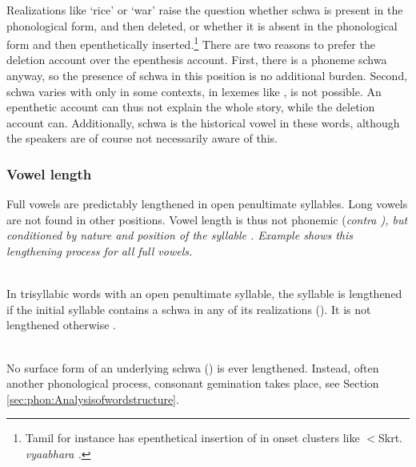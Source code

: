 Realizations like `rice' or `war' raise the question whether schwa is present in the phonological form, and then deleted, or whether it is absent in the phonological form and then  epenthetically inserted.\footnote{Tamil for instance has epenthetical insertion of  in onset clusters like $<$Skrt. \em vyaabhara \em \citep[103]{AnnamalaiEtAl1998}.} There are two reasons to prefer the deletion account over the epenthesis account. First, there is a phoneme schwa anyway, so the presence of schwa in this position is no additional burden. Second, schwa varies with \zero{} only in some contexts, in lexemes like , \zero{} is not possible. An epenthetic account can thus not explain the whole story, while the deletion account can. Additionally, schwa is the historical vowel in these words, although the speakers are of course not necessarily aware of this.



\subsubsection{Vowel length}\label{sec:phon:Vowellength}
Full vowels are predictably lengthened in open penultimate syllables.  Long vowels are not found in other positions. Vowel length is thus not phonemic (\em contra \em \citet{Bichsel, SmithEtAl2004}), but conditioned by nature and position of the syllable \citep[cf.][]{Tapovanaye1995}. Example  shows this lengthening process for all full vowels.


 \\
In trisyllabic words with an open penultimate syllable, the syllable is lengthened if the initial syllable contains a schwa  in any of its realizations (). It is not lengthened otherwise .




 \\
No surface form of an underlying schwa () is ever lengthened. Instead, often another phonological process, consonant gemination takes place, see Section \ref{sec:phon:Analysisofwordstructure}.

